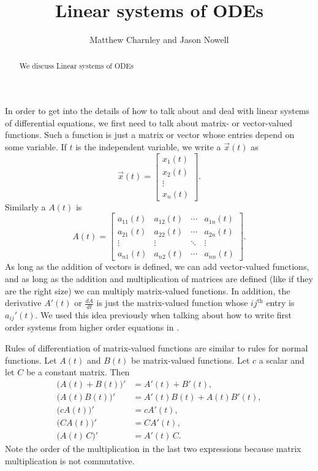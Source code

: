 \documentclass{ximera}
\title{Linear systems of ODEs}
\author{Matthew Charnley and Jason Nowell}
\begin{document}
\begin{abstract}
    We discuss Linear systems of ODEs
\end{abstract}
\maketitle


\label{linsystems:section}


In order to get into the details of how to talk about and deal with linear systems of differential equations, we first need to talk about matrix- or vector-valued functions. Such a function is just a matrix or vector whose entries depend on some variable. If $t$ is the independent variable, we write a \emph{} $\vec{x}(t)$ as
\begin{equation*}
    \vec{x}(t) = 
    \begin{bmatrix}
        x_1(t) \\
        x_2(t) \\
        \vdots \\
        x_n(t)
    \end{bmatrix} .
\end{equation*}
Similarly a \emph{} $A(t)$ is
\begin{equation*}
    A(t) =
    \begin{bmatrix}
        a_{11}(t) & a_{12}(t) & \cdots & a_{1n}(t) \\
        a_{21}(t) & a_{22}(t) & \cdots & a_{2n}(t) \\
        \vdots & \vdots & \ddots & \vdots \\
        a_{n1}(t) & a_{n2}(t) & \cdots & a_{nn}(t)
    \end{bmatrix} .
\end{equation*}
As long as the addition of vectors is defined, we can add vector-valued functions, and as long as the addition and multiplication of matrices are defined (like if they are the right size) we can multiply matrix-valued functions. In addition, the derivative $A'(t)$ or $\frac{dA}{dt}$ is just the matrix-valued function whose $ij^{\text{th}}$ entry is $a_{ij}'(t)$. We used this idea previously when talking about how to write first order systems from higher order equations in .

Rules of differentiation of matrix-valued functions are similar to rules for normal functions.  Let $A(t)$ and $B(t)$ be matrix-valued functions.  Let $c$ a scalar and let $C$ be a constant matrix. Then
\begin{align*}
    \bigl(A(t)+B(t)\bigr)' & = A'(t) + B'(t), \\
    \bigl(A(t)B(t)\bigr)' & = A'(t)B(t) + A(t)B'(t), \\
    \bigl(cA(t)\bigr)' & = cA'(t), \\
    \bigl(CA(t)\bigr)' & = CA'(t), \\
    \bigl(A(t)\,C\bigr)' & = A'(t)\,C .
\end{align*}
Note the order of the multiplication in the last two expressions because matrix multiplication is not commutative.
\end{document}
